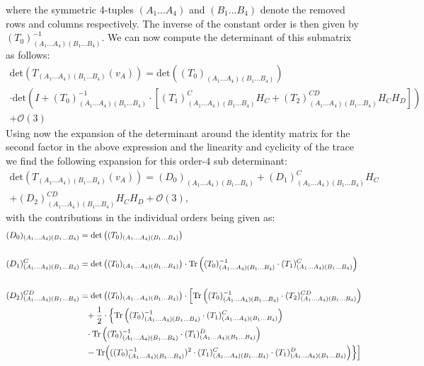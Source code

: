 where the symmetric 4-tuples $(A_1...A_4)$ and $(B_1...B_4)$ denote the removed rows and columns respectively. The inverse of the constant order is then given by $(T_0)^{-1}_{(A_1...A_4)(B_1...B_4)}$. We can now compute the determinant of this submatrix as follows:
\begin{multline}
    \mathrm{det}\left(T_{(A_1...A_4)(B_1...B_4)}(v_A)\right)
    = \mathrm{det}\left((T_0)_{(A_1...A_4)(B_1...B_4)}\right)\\ 
    \cdot \mathrm{det}\left (I +(T_0)^{-1}_{(A_1...A_4)(B_1...B_4)}
    \cdot \left [ (T_1)_{(A_1...A_4)(B_1...B_4)}^{C} H_C+(T_2)_{(A_1...A_4)(B_1...B_4)}^{CD} H_C H_D \right ]  \right ) \\
    + \mathcal{O}(3)  
\end{multline}
Using now the expansion of the determinant around the identity matrix for the second factor in the above expression and the linearity and cyclicity of the trace we
find the following expansion for this order-$4$ sub determinant:
\begin{multline}
    \mathrm{det}\left(T_{(A_1...A_4)(B_1...B_4)}(v_A)\right) = (D_0)_{(A_1...A_4)(B_1...B_4)} + (D_1)^C_{(A_1...A_4)(B_1...B_4)}H_C\\
    +(D_2)^{CD}_{(A_1...A_4)(B_1...B_4)}H_CH_D
    + \mathcal{O}(3),
\end{multline}
with the contributions in the individual orders being given as: 
\begin{align}\label{polyMatrices}
\begin{aligned}
  (D_0)_{(A_1...A_4)(B_1...B_4)} &=  \mathrm{det}\left((T_0)_{(A_1...A_4)(B_1...B_4)}\right) \\
  \\
  (D_1)^C_{(A_1...A_4)(B_1...B_4)} &= \mathrm{det}\left((T_0)_{(A_1...A_4)(B_1...B_4)}\right) \cdot \mathrm{Tr} \left ( (T_0)^{-1}_{(A_1...A_4)(B_1...B_4)}
    \cdot (T_1)_{(A_1...A_4)(B_1...B_4)}^{C} \right) \\
    \\
    (D_2)^{CD}_{(A_1...A_4)(B_1...B_4)} &= \mathrm{det}\left((T_0)_{(A_1...A_4)(B_1...B_4)}\right)
     \cdot \Bigl [ \mathrm{Tr} \left ( (T_0)^{-1}_{(A_1...A_4)(B_1...B_4)}
    \cdot (T_2)_{(A_1...A_4)(B_1...B_4)}^{CD} \right ) \\
     &\hphantom{=}
    + \frac{1}{2} \cdot \Bigl \{ \mathrm{Tr}\left ( (T_0)^{-1}_{(A_1...A_4)(B_1...B_4)} \cdot (T_1)_{(A_1...A_4)(B_1...B_4)}^{C} \right )\\
     &\hphantom{=} \cdot \mathrm{Tr}\left ( (T_0)^{-1}_{(A_1...A_4)(B_1...B_4)} \cdot (T_1)_{(A_1...A_4)(B_1...B_4)}^{D} \right )  \\
      &\hphantom{=} 
    - \mathrm{Tr}\Bigl  (((T_0)^{-1}_{(A_1...A_4)(B_1...B_4)})^2 \cdot (T_1)_{(A_1...A_4)(B_1...B_4)}^{C} \cdot (T_1)_{(A_1...A_4)(B_1...B_4)}^{D}  \Bigr )    \Bigr \} \Bigr ]
    \end{aligned}
\end{align}
